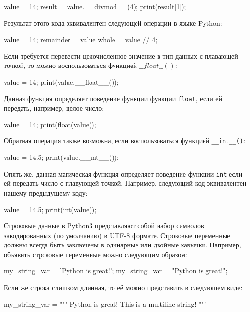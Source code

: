 \begin{python}
value = 14;
result = value.__divmod__(4);
print(result[1]);
\end{python}  

Результат этого кода эквивалентен следующей операции в языке Python:

\begin{python}
value = 14;
remainder = value %
whole = value // 4;
\end{python}

Если требуется перевести целочисленное значение в тип данных с плавающей точкой,
то можно воспользоваться функцией $\_\_float\_\_()$:

\begin{python}
value = 14;
print(value.__float__());
\end{python}

Данная функция определяет поведение функции функции \texttt{float},
если ей передать, например, целое число:

\begin{python}
value = 14;
print(float(value));
\end{python}

Обратная операция также возможна, если воспользоваться функцией \texttt{\_\_int\_\_()}:

\begin{python}
value = 14.5;
print(value.__int__());
\end{python} 

Опять же, данная магическая функция определяет поведение функции \texttt{int}
если ей передать число с плавующей точкой. Например, следующий код эквивалентен
нашему предыдущему коду:

\begin{python}
value = 14.5;
print(int(value));
\end{python} 


Строковые данные в Python3 представляют собой набор символов, 
закодированных (по умолчанию) в UTF-8 формате. Строковые переменные должны всегда 
быть заключены в одинарные или двойные кавычки. Например, 
объявить строковые переменные можно следующим образом:

\begin{python}
my_string_var = 'Python is great!';
my_string_var = "Python is great!";
\end{python}

Если же строка слишком длинная, то её можно представить в следующем виде:

\begin{python}
my_string_var = """
Python is great!
This is a multiline string!
"""
\end{python}

